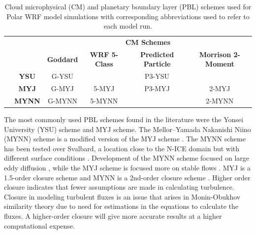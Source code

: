 \begin{table}[t]
\doublespacing
\centering
\footnotesize
{\begin{tabular}{| c | c | c | c | c | c |}
  \hline
 \rowcolor[HTML]{F3F3F3} & & \multicolumn{4}{c|}{\textbf{CM Schemes}} \\
 \rowcolor[HTML]{F3F3F3} & & \textbf{Goddard} & \textbf{WRF 5-Class} & \textbf{Predicted Particle} & \textbf{Morrison 2-Moment} \\
  \hline
\cellcolor[HTML]{F3F3F3}
 &\textbf{YSU} & G-YSU & & P3-YSU & \\
\cellcolor[HTML]{F3F3F3}  & \textbf{MYJ} & G-MYJ & 5-MYJ & P3-MYJ & 2-MYJ \\ 
\cellcolor[HTML]{F3F3F3}  \parbox[t]{3mm}{} \parbox[t]{2mm}{} & \textbf{MYNN} & G-MYNN & 5-MYNN & & 2-MYNN \\
  \hline
\end{tabular}}
\caption[Cloud microphysics and planetary boundary layer schemes used in polar WRF simulations.]{Cloud microphysical (CM) and planetary boundary layer (PBL) schemes used for Polar WRF model simulations with corresponding abbreviations used to refer to each model run.}
\label{tab:schemes}
\end{table}

The most commonly used PBL schemes found in the literature were the Yonsei University (YSU) scheme \citep{hong:2004} and MYJ scheme. The Mellor–Yamada Nakanishi Niino (MYNN) scheme \citep{olson:2019} is a modified version of the MYJ scheme \citep{mesinger:1993}. The MYNN scheme has been tested over Svalbard, a location close to the N-ICE domain but with different surface conditions \citep{pilguj:2018}. Development of the MYNN scheme focused on large eddy diffusion \citep{cohen:2015}, while the MYJ scheme is focused more on stable flows \citep{janjic:1994, mellor:1982}. MYJ is a 1.5-order closure scheme and MYNN is a 2nd-order closure scheme \citep{pilguj:2018}. Higher order closure indicates that fewer assumptions are made in calculating turbulence. Closure in modeling turbulent fluxes is an issue that arises in Monin-Obukhov similarity theory due to need for estimations in the equations to calculate the fluxes. A higher-order closure will give more accurate results at a higher computational expense. 

